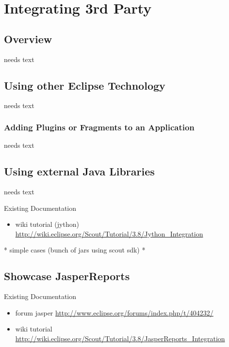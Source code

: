\documentclass[a4paper,10pt,twoside]{book}
\begin{document}
  \sloppy
\fi


\chapter{Integrating 3rd Party}

\section{Overview}
needs text

\section{Using other Eclipse Technology}
needs text

\subsection{Adding Plugins or Fragments to an Application}
needs text

\section{Using external Java Libraries}
needs text

\noindent Existing Documentation
\begin{itemize}
  \item wiki tutorial (jython) \url{http://wiki.eclipse.org/Scout/Tutorial/3.8/Jython_Integration}
\end{itemize}

  * simple cases (bunch of jars using scout sdk)
  * 
  
\section{Showcase JasperReports}

\noindent Existing Documentation
\begin{itemize}
  \item forum jasper \url{http://www.eclipse.org/forums/index.php/t/404232/} 
  \item wiki tutorial \url{http://wiki.eclipse.org/Scout/Tutorial/3.8/JasperReports_Integration}
\end{itemize}
\end{document}

